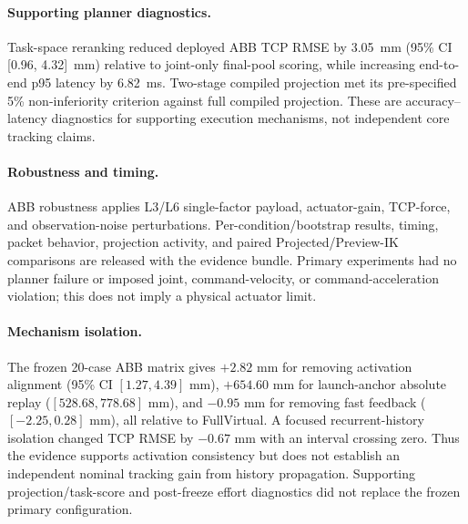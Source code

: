 \documentclass[10pt]{article}
\begin{document}
\paragraph{Supporting planner diagnostics.}
Task-space reranking reduced deployed ABB TCP RMSE by 3.05~mm (95\% CI
[0.96, 4.32]~mm) relative to joint-only final-pool scoring, while increasing
end-to-end p95 latency by 6.82~ms. Two-stage compiled projection met its
pre-specified 5\% non-inferiority criterion against full compiled projection.
These are accuracy--latency diagnostics for supporting execution mechanisms,
not independent core tracking claims.

\paragraph{Robustness and timing.}
ABB robustness applies L3/L6 single-factor payload, actuator-gain, TCP-force,
and observation-noise perturbations. Per-condition/bootstrap results, timing,
packet behavior, projection activity, and paired Projected/Preview-IK
comparisons are released with the evidence bundle. Primary experiments had no
planner failure or imposed joint, command-velocity, or command-acceleration
violation; this does not imply a physical actuator limit.

\paragraph{Mechanism isolation.}
The frozen 20-case ABB matrix gives $+2.82$ mm for removing activation
alignment (95\% CI $[1.27,4.39]$ mm), $+654.60$ mm for launch-anchor absolute
replay ($[528.68,778.68]$ mm), and $-0.95$ mm for removing fast feedback
($[-2.25,0.28]$ mm), all relative to FullVirtual. A focused recurrent-history
isolation changed TCP RMSE by $-0.67$ mm with an interval crossing zero. Thus
the evidence supports activation consistency but does not establish an
independent nominal tracking gain from history propagation. Supporting
projection/task-score and post-freeze effort diagnostics did not replace the
frozen primary configuration.
\end{document}
